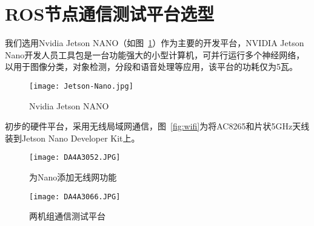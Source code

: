 


\section{ROS节点通信测试平台选型}

我们选用Nvidia Jetson NANO（如图~\ref{fig:Jetson-Nano}）作为主要的开发平台，NVIDIA Jetson Nano开发人员工具包是一台功能强大的小型计算机，可并行运行多个神经网络，以用于图像分类，对象检测，分段和语音处理等应用，该平台的功耗仅为5瓦。

\begin{figure}[htbp] %
    \centering
    \texttt{[image: Jetson-Nano.jpg]}
    \caption{Nvidia Jetson NANO}
    \label{fig:Jetson-Nano}
\end{figure}

初步的硬件平台，采用无线局域网通信，图~\ref{fig:wifi}为将AC8265和片状5GHz天线装到Jetson Nano Developer Kit上。

\begin{figure}[htbp]
    \begin{minipage}{0.48\textwidth}
      \centering
      \texttt{[image: DA4A3052.JPG]}
      \caption{为Nano添加无线网功能}
      \label{fig:wifi}
    \end{minipage}\hfill
    \begin{minipage}{0.48\textwidth}
      \centering
      \texttt{[image: DA4A3066.JPG]}
      \caption{两机组通信测试平台}
      \label{fig:two-setup}
    \end{minipage}
\end{figure}

